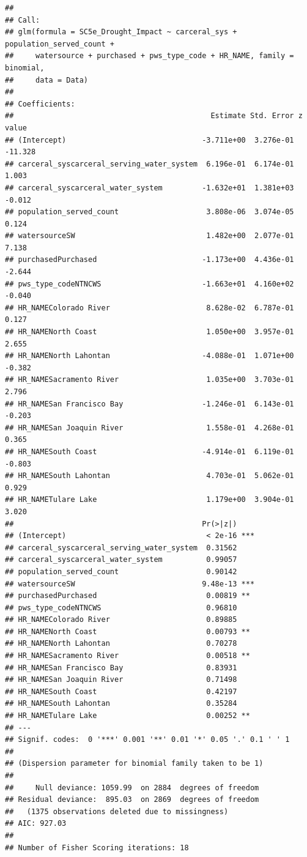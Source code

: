 \documentclass[
]{article}
\begin{document}
\begin{verbatim}
## 
## Call:
## glm(formula = SC5e_Drought_Impact ~ carceral_sys + population_served_count + 
##     watersource + purchased + pws_type_code + HR_NAME, family = binomial, 
##     data = Data)
## 
## Coefficients:
##                                             Estimate Std. Error z value
## (Intercept)                               -3.711e+00  3.276e-01 -11.328
## carceral_syscarceral_serving_water_system  6.196e-01  6.174e-01   1.003
## carceral_syscarceral_water_system         -1.632e+01  1.381e+03  -0.012
## population_served_count                    3.808e-06  3.074e-05   0.124
## watersourceSW                              1.482e+00  2.077e-01   7.138
## purchasedPurchased                        -1.173e+00  4.436e-01  -2.644
## pws_type_codeNTNCWS                       -1.663e+01  4.160e+02  -0.040
## HR_NAMEColorado River                      8.628e-02  6.787e-01   0.127
## HR_NAMENorth Coast                         1.050e+00  3.957e-01   2.655
## HR_NAMENorth Lahontan                     -4.088e-01  1.071e+00  -0.382
## HR_NAMESacramento River                    1.035e+00  3.703e-01   2.796
## HR_NAMESan Francisco Bay                  -1.246e-01  6.143e-01  -0.203
## HR_NAMESan Joaquin River                   1.558e-01  4.268e-01   0.365
## HR_NAMESouth Coast                        -4.914e-01  6.119e-01  -0.803
## HR_NAMESouth Lahontan                      4.703e-01  5.062e-01   0.929
## HR_NAMETulare Lake                         1.179e+00  3.904e-01   3.020
##                                           Pr(>|z|)    
## (Intercept)                                < 2e-16 ***
## carceral_syscarceral_serving_water_system  0.31562    
## carceral_syscarceral_water_system          0.99057    
## population_served_count                    0.90142    
## watersourceSW                             9.48e-13 ***
## purchasedPurchased                         0.00819 ** 
## pws_type_codeNTNCWS                        0.96810    
## HR_NAMEColorado River                      0.89885    
## HR_NAMENorth Coast                         0.00793 ** 
## HR_NAMENorth Lahontan                      0.70278    
## HR_NAMESacramento River                    0.00518 ** 
## HR_NAMESan Francisco Bay                   0.83931    
## HR_NAMESan Joaquin River                   0.71498    
## HR_NAMESouth Coast                         0.42197    
## HR_NAMESouth Lahontan                      0.35284    
## HR_NAMETulare Lake                         0.00252 ** 
## ---
## Signif. codes:  0 '***' 0.001 '**' 0.01 '*' 0.05 '.' 0.1 ' ' 1
## 
## (Dispersion parameter for binomial family taken to be 1)
## 
##     Null deviance: 1059.99  on 2884  degrees of freedom
## Residual deviance:  895.03  on 2869  degrees of freedom
##   (1375 observations deleted due to missingness)
## AIC: 927.03
## 
## Number of Fisher Scoring iterations: 18
\end{verbatim}
\end{document}
